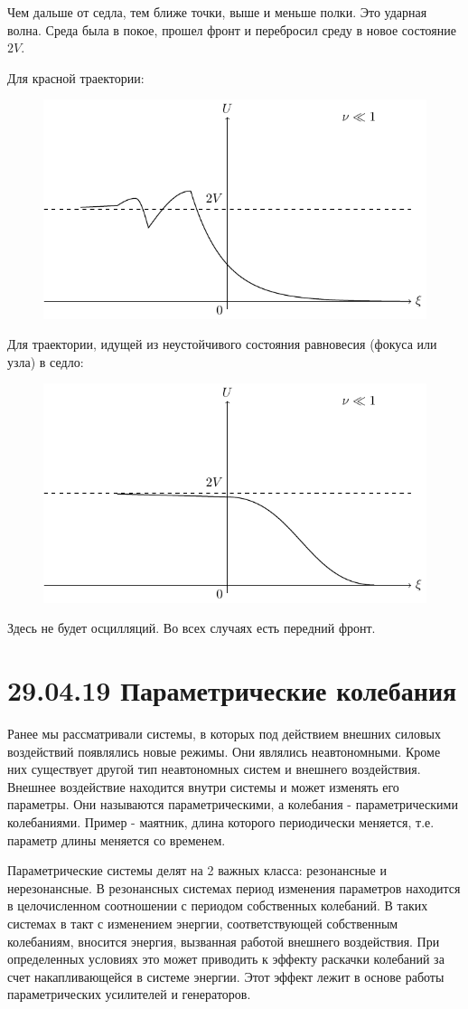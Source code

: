 Чем дальше от седла, тем ближе точки, выше и меньше полки. Это ударная волна.  Среда была в покое, прошел фронт и перебросил среду в новое состояние $2V$.

Для красной траектории:
\begin{figure}[H]
	\centering
	\includegraphics[width=0.6\linewidth]{fig/fig31.pdf}   
\end{figure}

Для траектории, идущей из неустойчивого состояния равновесия (фокуса или узла) в седло:
\begin{figure}[H]
	\centering
	\includegraphics[width=0.6\linewidth]{fig/fig32.pdf}   
\end{figure}

Здесь не будет осцилляций. Во всех случаях есть передний фронт.

\section{29.04.19 Параметрические колебания}
Ранее мы рассматривали системы, в которых под действием внешних силовых воздействий появлялись новые режимы. Они являлись неавтономными. Кроме них существует другой тип неавтономных систем и внешнего воздействия. Внешнее воздействие находится внутри системы и может изменять его параметры. Они называются параметрическими, а колебания - параметрическими колебаниями. Пример - маятник, длина которого периодически меняется, т.е. параметр длины меняется со временем. 

Параметрические системы делят на 2 важных класса: резонансные и нерезонансные. В резонансных системах период изменения параметров находится в целочисленном соотношении с периодом собственных колебаний. В таких системах в такт с изменением энергии, соответствующей собственным колебаниям, вносится энергия, вызванная работой внешнего воздействия. При определенных условиях это может приводить к эффекту раскачки колебаний за счет накапливающейся в системе энергии. Этот эффект лежит в основе работы параметрических усилителей и генераторов. 

